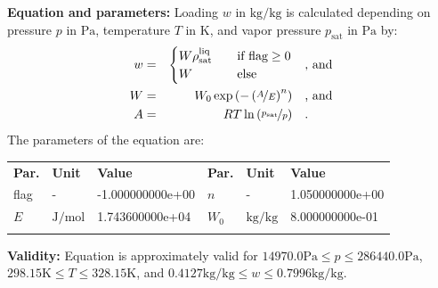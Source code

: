 \textbf{Equation and parameters:}
\newline
%
Loading $w$ in $\si{\kilogram\per\kilogram}$ is calculated depending on pressure $p$ in $\si{\pascal}$, temperature $T$ in $\si{\kelvin}$, and vapor pressure $p_\mathrm{sat}$ in $\si{\pascal}$ by:
%
\begin{equation*}
\begin{split}
w &=& \begin{cases} W \rho_\mathrm{sat}^{\mathrm{liq}} & \quad \text{if flag} \geq 0 \\ W & \quad \text{else} \end{cases} & \quad\text{, and} \\
W &=& W_0 \exp \left( - \left( \nicefrac{A}{E} \right) ^{n} \right) & \quad\text{, and} \\
A &=& R T \ln \left( \nicefrac{p_\mathrm{sat}}{p} \right) & \quad\text{.} \\
\end{split}
\end{equation*}
%
The parameters of the equation are:
%
\begin{longtable}[l]{lll|lll}
\toprule
\addlinespace
\textbf{Par.} & \textbf{Unit} & \textbf{Value} &	\textbf{Par.} & \textbf{Unit} & \textbf{Value} \\
\addlinespace
\midrule
\endhead

\bottomrule
\endfoot
\bottomrule
\endlastfoot
\addlinespace

flag & - & -1.000000000e+00 & $n$ & - & 1.050000000e+00 \\
$E$ & $\si{\joule\per\mole}$ & 1.743600000e+04 & $W_0$ & $\si{\kilogram\per\kilogram}$ & 8.000000000e-01 \\

\addlinespace\end{longtable}

\textbf{Validity:}
\newline
Equation is approximately valid for $14970.0 \si{\pascal} \leq p \leq 286440.0 \si{\pascal}$,  $298.15 \si{\kelvin} \leq T \leq 328.15 \si{\kelvin}$, and $0.4127 \si{\kilogram\per\kilogram} \leq w \leq 0.7996 \si{\kilogram\per\kilogram}$.
\newline

